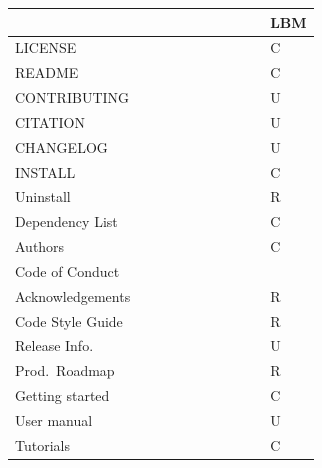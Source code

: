 \documentclass[runningheads]{llncs}
\begin{document}
\begin{table}[!h]
	\begin{center}
	\begin{tabular}{ p{2.5cm}p{0.9cm}p{0.9cm}p{0.8cm}p{0.9cm}p{0.9cm}p{0.8cm}p{0.8cm}p{0.8cm}p{0.8cm}p{0.8cm} }
	\toprule
	~ \ & \cite{USGS2019} & \cite{TobiasEtAl2018} & \cite{BrettEtAl2021} & \cite{WilsonEtAl2016} & \cite{SmithAndRoscoe2018} & \cite{HerouxEtAl2008} & \cite{ThielEtAl2020} & \cite{vanGompelEtAl2016} & \cite{OrvizEtAl2017} & LBM\\
	\midrule
	LICENSE & \checkmark & \checkmark & \checkmark & \checkmark & \checkmark & & \checkmark & \checkmark & \checkmark & C\\
	README &  & \checkmark & \checkmark & \checkmark & \checkmark & & \checkmark & \checkmark & \checkmark & C\\
	CONTRIBUTING &  & \checkmark & \checkmark & \checkmark & \checkmark & & \checkmark & \checkmark & \checkmark & U\\
	CITATION &  &  &  & \checkmark & & & & \checkmark & \checkmark & U\\
	CHANGELOG &  & \checkmark &  & \checkmark & \checkmark & & \checkmark &  &  & U\\
	INSTALL &  &  &  &  & \checkmark & & \checkmark & \checkmark & \checkmark & C\\
	\midrule
	Uninstall &  &  &  &  & & & & \checkmark & & R\\
	Dependency List &  &  & \checkmark & & \checkmark & & & \checkmark &  & C\\
	Authors &  &  &  &  &  &  & \checkmark & \checkmark & \checkmark & C\\
	Code of Conduct &  &  &  &  & & & \checkmark & & & \\
	Acknowledgements &  &  &  &  &  &  & \checkmark & \checkmark & \checkmark & R\\
	Code Style Guide &  & \checkmark &  &  & & & \checkmark & \checkmark & \checkmark & R\\
	Release Info. &  & \checkmark &  &  & & \checkmark & \checkmark & & & U\\
	Prod.\ Roadmap &  &  &  &  & & \checkmark & \checkmark & \checkmark & & R\\
	\midrule
	Getting started &  &  &  &  & \checkmark & & \checkmark & \checkmark & \checkmark & C\\
	User manual &  &  & \checkmark &  & & & \checkmark & & & U\\
	Tutorials &  &  &  &  & & & \checkmark & & & C\\

\end{tabular}
\end{center}
\end{table}
\end{document}
